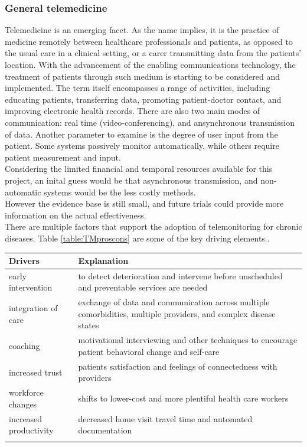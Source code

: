 \documentclass[11pt]{article}
\begin{document}
\subsubsection{General telemedicine}
Telemedicine is an emerging facet.  As the name implies, it is the practice of medicine remotely between healthcare professionals and patients, as opposed to the usual care in a clinical setting, or a carer transmitting data from the patients' location. With the advancement of the enabling communications technology, the treatment of patients through such medium is starting to be considered and implemented.  The term itself encompasses a range of activities, including educating patients, transferring data, promoting patient-doctor contact, and improving electronic health records. There are also two main modes of communication: real time (video-conferencing), and ansynchronous transmission of data.  Another parameter to examine is the degree of user input from the patient. Some systems passively monitor automatically, while others require patient measurement and input.\cite{TM5}  
\\ \indent
Considering the limited financial and temporal resources available for this project, an inital guess would be that asynchronous transmission, and non-automatic systems would be the less costly methods.   
\\ \indent
However the evidence base is still small, and future trials could provide more information on the actual effectiveness.
\\ \indent
There are multiple factors that support the adoption of telemonitoring for chronic diseases.  Table \ref{table:TMproscons} are some of the key driving elements.\cite{TM2}.  


\begin{center}
    \begin{tabular}{ | l |  p{10cm} |}
    \hline
    Drivers & Explanation 
    \\ \hline
    early intervention & to detect deterioration and intervene before unscheduled and preventable services are needed
    \\ \hline
     integration of care & exchange of data and communication across multiple comorbidities, multiple providers, and complex disease states
     \\ \hline
     coaching & motivational interviewing and other techniques to encourage patient behavioral change and self-care
     \\ \hline
      increased trust & patients satisfaction and feelings of connectedness with providers
     \\ \hline
     workforce changes & shifts to lower-cost and more plentiful health care workers
     \\ \hline
     increased productivity & decreased home visit travel time and automated documentation
	\\ \hline
    \label{table:TMproscons}

    \end{tabular}
\end{center}
\end{document}
